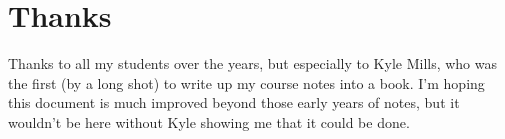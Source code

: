 \documentclass[10pt, a5paper, twoside, openany]{memoir}
\begin{document}
\section{Thanks}

Thanks to all my students over the years, but especially to Kyle Mills, who was the first (by a long shot) to write up my course notes into a book.  I'm hoping this document is much improved beyond those early years of notes, but it wouldn't be here without Kyle showing me that it could be done.



\mainmatter












\end{document}
